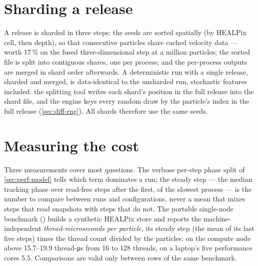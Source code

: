 
\section{Sharding a release}\label{sec:perf-shard}

A release is sharded in three steps: the seeds are sorted spatially (by HEALPix cell, then depth),
so that consecutive particles share cached velocity data --- worth 17\,\% on the fused
three-dimensional step at a million particles; the sorted file is split into contiguous shares, one
per process; and the per-process outputs are merged in shard order afterwards. A deterministic run
with a single release, sharded and merged, is data-identical to the unsharded run, stochastic features
included: the splitting tool writes each shard's position in the full release into the shard file, and
the engine keys every random draw by the particle's index in the full release (\cref{sec:diff-rng}).
All shards therefore use the same seeds.

\section{Measuring the cost}\label{sec:perf-measure}

Three measurements cover most questions. The verbose per-step phase split of
\cref{sec:perf-model} tells which term dominates a run; the steady step --- the median tracking
phase over read-free steps after the first, of the slowest process --- is the number to compare
between runs and configurations, never a mean that mixes steps that read snapshots with steps that
do not. The portable single-node benchmark () builds a
synthetic HEALPix store and reports the machine-independent \emph{thread-microseconds per
particle}, its steady step (the mean of its last five steps) times the thread count divided by the
particles: on the compute node
above 15.7--19.9 thread-\si{\micro s} from 16 to 128 threads, on a laptop's five performance cores
5.5. Comparisons are valid only between rows of the same benchmark.

